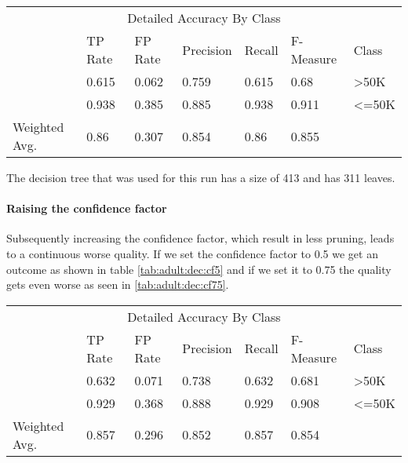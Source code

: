 \documentclass[paper=a4, fontsize=11pt]{scrartcl} %
\numberwithin{equation}{section} %
\numberwithin{figure}{section} %
\numberwithin{table}{section} %
\begin{document}
\begin{table*}[htb]\centering
    \begin{tabular*}{\columnwidth}{@{}lllllll@{}}
        \toprule 
        \multicolumn{7}{c}{Detailed Accuracy By Class} \\ 
               & TP Rate & FP Rate & Precision & Recall &  F-Measure &  Class \\ \midrule  
               & 0.615   & 0.062   & 0.759     & 0.615  &  0.68      &  >50K  \\  
               & 0.938   & 0.385   & 0.885     & 0.938  &  0.911     &  <=50K \\  
Weighted Avg.  & 0.86    & 0.307   & 0.854     & 0.86   &  0.855     &        \\  \bottomrule 
    \end{tabular*}
\caption{Decision Tree -- Default Settings} 
\label{tab:adult:dec:default}
\end{table*}
\FloatBarrier

The decision tree that was used for this run has a size of 413 and has 311 leaves.

\paragraph{Raising the confidence factor}
Subsequently increasing the confidence factor, which result in less pruning, leads to a continuous worse quality. If we set the confidence factor to 0.5 we get an outcome as shown in table \ref{tab:adult:dec:cf5} and if we set it to 0.75 the quality gets even worse as seen in \ref{tab:adult:dec:cf75}.
\begin{table*}[htb]\centering
    \begin{tabular*}{\columnwidth}{@{}lllllll@{}}
        \toprule 
        \multicolumn{7}{c}{Detailed Accuracy By Class} \\ 
              &  TP Rate & FP Rate & Precision & Recall & F-Measure & Class    \\  \midrule
              &  0.632   & 0.071   & 0.738     & 0.632  & 0.681     & >50K     \\ 
              &  0.929   & 0.368   & 0.888     & 0.929  & 0.908     & <=50K    \\ 
Weighted Avg. &  0.857   & 0.296   & 0.852     & 0.857  & 0.854     &          \\  \bottomrule
    \end{tabular*}
\caption{Decision Tree -- Confidence Factor of 0.5} 
\label{tab:adult:dec:cf5}
\end{table*}
\FloatBarrier
\end{document}

